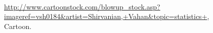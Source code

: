 \documentclass[12pt,letterpaper,final]{article}
\begin{document}
\setcounter{page}{1}




\vspace*{1cm}

~\\[1cm]

\begin{figure}[ht]
\caption{\label{Cartoonstock_FallingArrow}
\url{http://www.cartoonstock.com/blowup_stock.asp?imageref=vsh0184&artist=Shirvanian,+Vahan&topic=statistics+}, 
Cartoon.
}
\end{figure}
\end{document}
